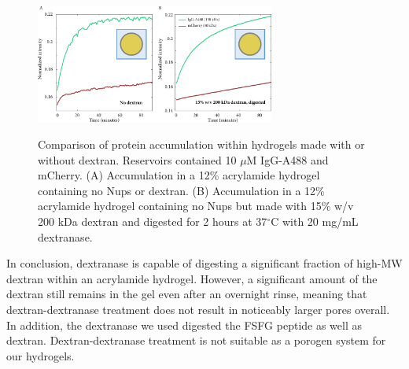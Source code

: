 \begin{figure}
\caption[Protein accumulation within dextran/dextranase hyrogels.]{Comparison of protein accumulation within hydrogels made with or without dextran.  Reservoirs contained 10 $\mu$M IgG-A488 and mCherry. (A) Accumulation in a 12\% acrylamide hydrogel containing no Nups or dextran. (B) Accumulation in a 12\% acrylamide hydrogel containing no Nups but made with 15\% w/v 200 kDa dextran and digested for 2 hours at 37$^\circ$C with 20 mg/mL dextranase.}
\centering
\includegraphics[width=0.7\textwidth]{figs/ch03/dxase-results}
\label{fig:dxase-results}
\end{figure} %

In conclusion, dextranase is capable of digesting a significant fraction of high-MW dextran within an acrylamide hydrogel.  However, a significant amount of the dextran still remains in the gel even after an overnight rinse, meaning that dextran-dextranase treatment does not result in noticeably larger pores overall.  In addition, the dextranase we used digested the FSFG peptide as well as dextran.  Dextran-dextranase treatment is not suitable as a porogen system for our hydrogels.

